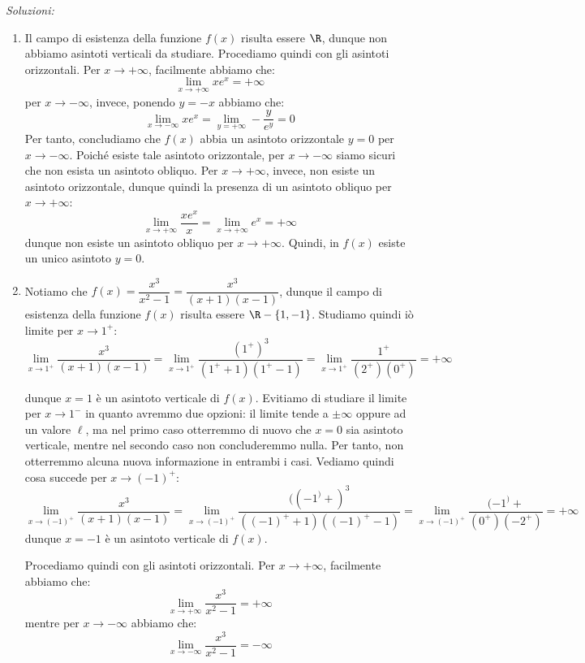 \documentclass[a4paper, 12pt]{report}
\begin{document}
    \textit{Soluzioni:}

    \begin{enumerate}
        \item Il campo di esistenza della funzione $f(x)$ risulta essere $\R$, dunque non abbiamo asintoti verticali da studiare. Procediamo quindi con gli asintoti orizzontali. Per $x \to +\infty$, facilmente abbiamo che:
        \[\lim_{x \to +\infty} xe^x = +\infty\]
        per $x \to -\infty$, invece, ponendo $y = -x$ abbiamo che:
        \[\lim_{x \to -\infty} xe^x = \lim_{y = +\infty} -\frac{y}{e^y} = 0\]
        Per tanto, concludiamo che $f(x)$ abbia un asintoto orizzontale $y = 0$ per $x \to -\infty$. Poiché esiste tale asintoto orizzontale, per $x \to -\infty$ siamo sicuri che non esista un asintoto obliquo. Per $x \to +\infty$, invece, non esiste un asintoto orizzontale, dunque quindi la presenza di un asintoto obliquo per $x \to +\infty$:
        \[\lim_{x \to +\infty} \frac{xe^x}{x} = \lim_{x \to +\infty} e^x = +\infty\]
        dunque non esiste un asintoto obliquo per $x \to +\infty$. Quindi, in $f(x)$ esiste un unico asintoto $y = 0$.

        \item Notiamo che $f(x) = \dfrac{x^3}{x^2-1} = \dfrac{x^3}{(x+1)(x-1)}$, dunque il campo di esistenza della funzione $f(x)$ risulta essere $\R-\{1,-1\}$. Studiamo quindi iò limite per $x \to 1^+$:
        \[\lim_{x \to 1^+} \dfrac{x^3}{(x+1)(x-1)} = \lim_{x \to 1^+} \dfrac{(1^+)^3}{(1^++1)(1^+-1)} = \lim_{x \to 1^+} \dfrac{1^+}{(2^+)(0^+)} = +\infty\]

        dunque $x = 1$ è un asintoto verticale di $f(x)$. Evitiamo di studiare il limite per $x \to 1^-$ in quanto avremmo due opzioni: il limite tende a $\pm \infty$ oppure ad un valore $\ell$, ma nel primo caso otterremmo di nuovo che $x = 0$ sia asintoto verticale, mentre nel secondo caso non concluderemmo nulla. Per tanto, non otterremmo alcuna nuova informazione in entrambi i casi. Vediamo quindi cosa succede per $x \to (-1)^+$:
        \[\lim_{x \to (-1)^+} \dfrac{x^3}{(x+1)(x-1)} = \lim_{x \to (-1)^+} \dfrac{((-1^)+)^3}{((-1)^++1)((-1)^+-1)} = \lim_{x \to (-1)^+} \dfrac{(-1^)+}{(0^+)(-2^+)} = +\infty\]
        dunque $x = -1$ è un asintoto verticale di $f(x)$.

        \newpage
        
        Procediamo quindi con gli asintoti orizzontali. Per $x \to +\infty$, facilmente abbiamo che:
        \[\lim_{x \to +\infty} \dfrac{x^3}{x^2-1} = +\infty\]
        mentre per $x \to -\infty$ abbiamo che:
        \[\lim_{x \to -\infty} \dfrac{x^3}{x^2-1} = -\infty\]


\end{enumerate}
\end{document}
